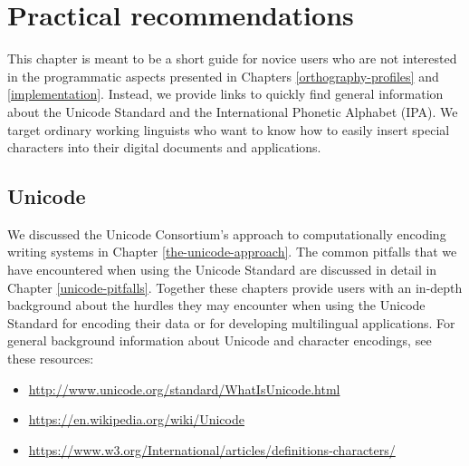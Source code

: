 \chapter{Practical recommendations}
\label{practical-recommendations}


This chapter is meant to be a short guide for novice users who are not interested in the programmatic aspects presented in Chapters \ref{orthography-profiles} and \ref{implementation}. Instead, we provide links to quickly find general information about the Unicode Standard and the International Phonetic Alphabet (IPA). We target ordinary working linguists who want to know how to easily insert special characters into their digital documents and applications.

\section{Unicode}
We discussed the Unicode Consortium's approach to computationally encoding writing systems in Chapter \ref{the-unicode-approach}. The common pitfalls that we have encountered when using the Unicode Standard are discussed in detail in Chapter \ref{unicode-pitfalls}. Together these chapters provide users with an in-depth background about the hurdles they may encounter when using the Unicode Standard for encoding their data or for developing multilingual applications. For general background information about Unicode and character encodings, see these resources:

\begin{itemize}
	\item \url{http://www.unicode.org/standard/WhatIsUnicode.html}
	\item \url{https://en.wikipedia.org/wiki/Unicode}
	\item \url{https://www.w3.org/International/articles/definitions-characters/}
\end{itemize}


